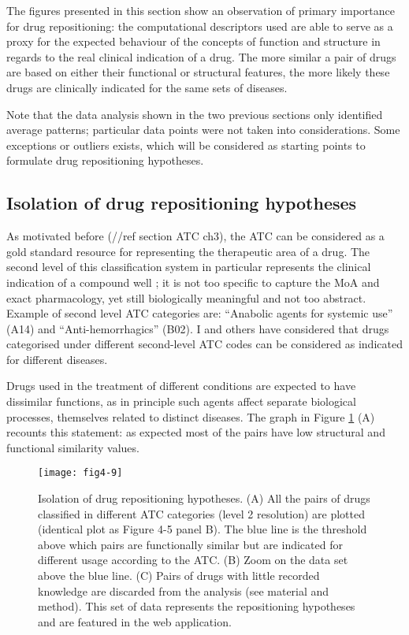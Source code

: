 The figures presented in this section show an observation of primary importance for drug repositioning: the computational descriptors used are able to serve as a proxy for the expected behaviour of the concepts of function and structure in regards to the real clinical indication of a drug. The more similar a pair of drugs are based on either their functional or structural features, the more likely these drugs are clinically indicated for the same sets of diseases.

Note that the data analysis shown in the two previous sections only identified average patterns; particular data points were not taken into considerations. Some exceptions or outliers exists, which will be considered as starting points to formulate drug repositioning hypotheses.

\subsection{Isolation of drug repositioning hypotheses}
As motivated before (//ref section ATC ch3), the ATC can be considered as a gold standard resource for representing the therapeutic area of a drug. The second level of this classification system in particular represents the clinical indication of a compound well \citep{world2006anatomical}; it is not too specific to capture the MoA and exact pharmacology, yet still biologically meaningful and not too abstract. Example of second level ATC categories are: “Anabolic agents for systemic use” (A14) and “Anti-hemorrhagics” (B02). I and others \citep{campillos2008drug} \citep{napolitano2013drug} have considered that drugs categorised under different second-level ATC codes can be considered as indicated for different diseases.

Drugs used in the treatment of different conditions are expected to have dissimilar functions, as in principle such agents affect separate biological processes, themselves related to distinct diseases. The graph in Figure \ref{fig4-9} (A) recounts this statement: as expected most of the pairs have low structural and functional similarity values.

\begin{figure}[ht]
    \centering
    \texttt{[image: fig4-9]}
    \caption{Isolation of drug repositioning hypotheses. (A) All the pairs of drugs classified in different ATC categories (level 2 resolution) are plotted (identical plot as Figure 4-5 panel B). The blue line is the threshold above which pairs are functionally similar but are indicated for different usage according to the ATC. (B) Zoom on the data set above the blue line. (C) Pairs of drugs with little recorded knowledge are discarded from the analysis (see material and method). This set of data represents the repositioning hypotheses and are featured in the web application.}
    \label{fig4-9}
\end{figure}

